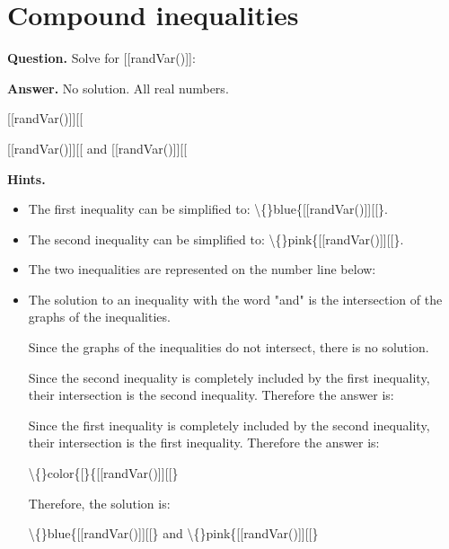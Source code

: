 \documentclass{article}
\begin{document}
\section*{Compound inequalities}
\textbf{Question.} Solve for [[randVar()]]:

\textbf{Answer.} No solution.
                    All real numbers.
                    
                        
                        [[randVar()]][[
                    
                    [[randVar()]][[ and [[randVar()]][[

\textbf{Hints.}
\begin{itemize}
  \item The first inequality can be simplified to:
                        \textbackslash\{\}blue\{[[randVar()]][[\}.
  \item The second inequality can be simplified to:
                        \textbackslash\{\}pink\{[[randVar()]][[\}.
  \item The two inequalities are represented on the number line below:
  \item The solution to an inequality with the word "and" is the intersection of the graphs of the inequalities.
                        
                        Since the graphs of the inequalities do not intersect, there is no solution.
                        
                            
                                Since the second inequality is completely included by the first inequality,
                                their intersection is the second inequality. Therefore the answer is:
                            
                                Since the first inequality is completely included by the second inequality,
                                their intersection is the first inequality. Therefore the answer is:
                            
                            \textbackslash\{\}color\{[\}\{[[randVar()]][[\}
                        
                        
                            Therefore, the solution is:
                            
                                \textbackslash\{\}blue\{[[randVar()]][[\} and
                                \textbackslash\{\}pink\{[[randVar()]][[\}
\end{itemize}
\end{document}
